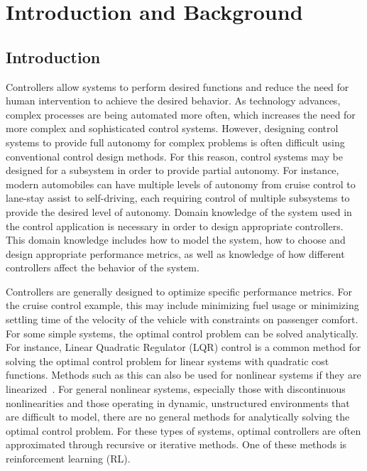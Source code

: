 

\chapter{Introduction and Background}
\label{chapter1}

\section{Introduction}

Controllers allow systems to perform desired functions and reduce the need for human intervention to achieve the desired behavior.
%
As technology advances,
complex processes are being automated more often, which increases
the need for more complex and sophisticated control systems.
%
However, designing control systems to provide full autonomy for complex problems is often difficult using conventional control design methods. For this reason, control systems may be designed for a subsystem in order to provide partial autonomy.
%
For instance, modern automobiles can have multiple levels of autonomy from cruise control to lane-stay assist to self-driving, each requiring control of multiple subsystems to provide the desired level of autonomy.
%
Domain knowledge of the system used in the control application is necessary in order to design appropriate controllers.
%
This domain knowledge includes how to model the system, how to choose and design appropriate performance metrics, as well as knowledge of how different controllers affect the behavior of the system.
%

Controllers are generally designed to optimize specific performance metrics. For the cruise control example, this may include minimizing fuel usage or minimizing settling time of the velocity of the vehicle with constraints on passenger comfort. For some simple systems, the optimal control problem can be solved analytically.
%
For instance, Linear Quadratic Regulator (LQR) control is a common method for solving the optimal control problem for linear systems with quadratic cost functions. Methods such as this can also be used for nonlinear systems if they are linearized~\cite{Dogan:2005a,Khan:2020a}.
%
For general nonlinear systems, especially those with discontinuous nonlinearities
and those operating in dynamic, unstructured environments that are difficult to model, there are no general methods for analytically solving the optimal control problem. For these types of systems, optimal controllers are often approximated through recursive or iterative methods. One of these methods is reinforcement learning (RL).

